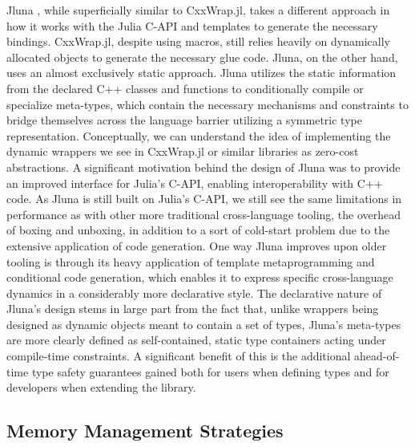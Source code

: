 Jluna \cite{jluna}, while superficially similar to CxxWrap.jl, takes a different approach in how it works with the Julia C-API and templates to generate the necessary bindings. CxxWrap.jl, despite using macros, still relies heavily on dynamically allocated objects to generate the necessary glue code. Jluna, on the other hand, uses an almost exclusively static approach. Jluna utilizes the static information from the declared C++ classes and functions to conditionally compile or specialize meta-types, which contain the necessary mechanisms and constraints to bridge themselves across the language barrier utilizing a symmetric type representation. Conceptually, we can understand the idea of implementing the dynamic wrappers we see in CxxWrap.jl or similar libraries as zero-cost abstractions. A significant motivation behind the design of Jluna was to provide an improved interface for Julia's C-API, enabling interoperability with C++ code. As Jluna is still built on Julia's C-API, we still see the same limitations in performance as with other more traditional cross-language tooling, \ie the overhead of boxing and unboxing, in addition to a sort of cold-start problem due to the extensive application of code generation. One way Jluna improves upon older tooling is through its heavy application of template metaprogramming and conditional code generation, which enables it to express specific cross-language dynamics in a considerably more declarative style. The declarative nature of Jluna's design stems in large part from the fact that, unlike wrappers being designed as dynamic objects meant to contain a set of types, Jluna's meta-types are more clearly defined as self-contained, static type containers acting under compile-time constraints. A significant benefit of this is the additional ahead-of-time type safety guarantees gained both for users when defining types and for developers when extending the library.    

\subsection{Memory Management Strategies}\label{s:memory_management}


